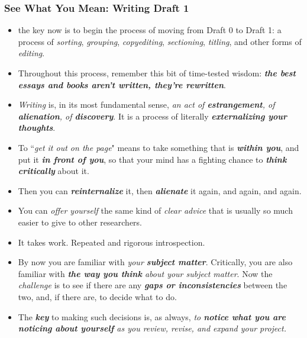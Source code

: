 \documentclass[11pt]{article}
\begin{document}
\subsubsection{See What You Mean: Writing Draft 1}
\begin{itemize}
\item the key now is to begin the process of moving from Draft 0 to Draft 1: a process of \emph{sorting}, \emph{grouping}, \emph{copyediting}, \emph{sectioning}, \emph{titling}, and other forms of \emph{editing}. 

\item Throughout this process, remember this bit of time-tested wisdom: \emph{\textbf{the best essays and books aren't written, they're rewritten}}.

\item \emph{Writing} is, in its most fundamental sense, \emph{an act of \textbf{estrangement}, of \textbf{alienation}, of \textbf{discovery}}.  It is a process of literally \emph{\textbf{externalizing your thoughts}}. 

\item To ``\emph{get it out on the page}" means to take something that is \emph{\textbf{within you}}, and put it \emph{\textbf{in front of you}}, so that your mind has a fighting chance to \emph{\textbf{think critically}} about it. 

\item Then you can \emph{\textbf{reinternalize}} it, then \emph{\textbf{alienate}} it again, and again, and again.

\item You can \emph{offer yourself} the same kind of \emph{clear advice} that is usually so much easier to give to other researchers.

\item It takes work. Repeated and rigorous introspection.

\item By now you are familiar with \emph{your \textbf{subject matter}}. Critically, you are also familiar with \emph{\textbf{the way you think} about your subject matter}. Now the \emph{challenge} is to see if there are any \emph{\textbf{gaps or inconsistencies}} between the two, and, if there are, to decide what to do.

\item The \emph{\textbf{key}} to making such decisions is, as always, \emph{to \textbf{notice what you are noticing about yourself} as you review, revise, and expand your project.}


\end{itemize}
\end{document}

